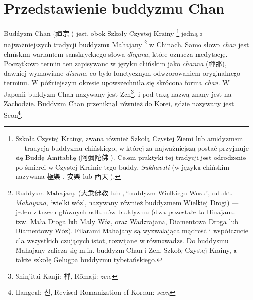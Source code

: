 \section{Przedstawienie buddyzmu Chan}
Buddyzm Chan (禪宗 ) jest, obok Szkoły Czystej Krainy%
\footnote{Szkoła Czystej Krainy, zwana również Szkołą Czystej Ziemi lub amidyzmem --- tradycja buddyzmu chińskiego, w której za najważniejszą postać przyjmuje się Buddę Amitābhę (阿彌陀佛 ). Celem praktyki tej tradycji jest odrodzenie po śmierci w Czystej Krainie tego buddy, \textit{Sukhavati} (w języku chińskim nazywana 極樂 , 安樂  lub 西天 ).}
jedną z najważniejszych tradycji buddyzmu Mahajany%
\footnote{Buddyzm Mahajany (大乘佛教  lub , `buddyzm Wielkiego Wozu', od skt. \textit{Mahāyāna}, `wielki wóz', nazywany również buddyzmem Wielkiej Drogi) --- jeden z trzech głównych odłamów buddyzmu (dwa pozostałe to Hinajana, tzw. Mała Droga lub Mały Wóz, oraz Wadżrajana, Diamentowa Droga lub Diamentowy Wóz). Filarami Mahajany są wyzwalająca mądrość i współczucie dla wszystkich czujących istot, rozwijane w równowadze. Do buddyzmu Mahajany zalicza się m.in. buddyzm Chan i Zen, Szkołę Czystej Krainy, a także szkołę Gelugpa buddyzmu tybetańskiego.}
w Chinach. Samo słowo \textit{chan} jest chińskim wariantem %
sanskryckiego słowa \textit{dhyāna}, które oznacza medytację.
Początkowo termin ten zapisywano w języku chińskim jako \textit{channa} (禪那), dawniej wymawiane \textit{dianna}, co było fonetycznym odwzorowaniem oryginalnego terminu.
W późniejszym okresie upowszechniła się skrócona forma \textit{chan}.
W Japonii buddyzm Chan nazywany jest Zen\footnote{Shinjitai Kanji: {\ipaexgothic 禅}, Rōmaji: \textit{zen}.}, i pod taką nazwą znany jest na Zachodzie.
Buddyzm Chan przeniknął również do Korei, gdzie nazywany jest Seon\footnote{Hangeul: {\Korean 선}, Revised Romanization of Korean: \textit{seon}}.


